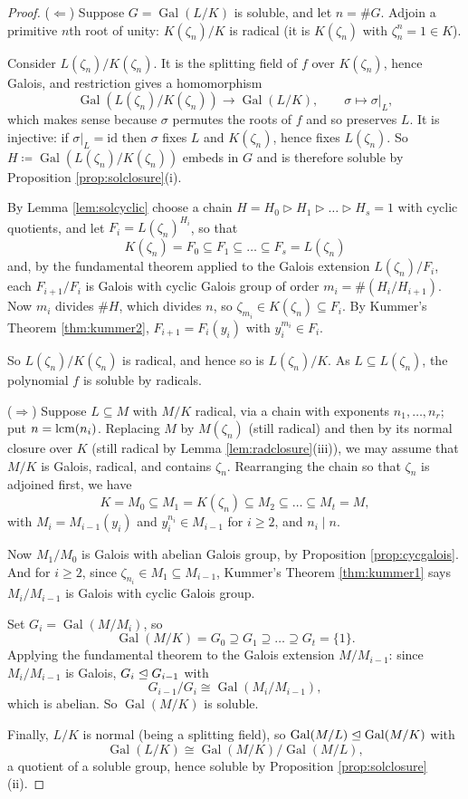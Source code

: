 \documentclass[a4paper]{scrartcl}
\newcommand{\Gal}{\operatorname{Gal}}
\begin{document}
\begin{proof}
	($\Leftarrow$) Suppose $G = \Gal(L/K)$ is soluble, and let $n = \#G$. Adjoin a primitive $n$th root of unity: $K(\zeta_n)/K$ is radical (it is $K(\zeta_n)$ with $\zeta_n^n = 1 \in K$).

	Consider $L(\zeta_n)/K(\zeta_n)$. It is the splitting field of $f$ over $K(\zeta_n)$, hence Galois, and restriction gives a homomorphism
	$$\Gal(L(\zeta_n)/K(\zeta_n)) \to \Gal(L/K), \qquad \sigma \mapsto \sigma|_L,$$
	which makes sense because $\sigma$ permutes the roots of $f$ and so preserves $L$. It is injective: if $\sigma|_L = \mathrm{id}$ then $\sigma$ fixes $L$ and $K(\zeta_n)$, hence fixes $L(\zeta_n)$. So $H \coloneqq \Gal(L(\zeta_n)/K(\zeta_n))$ embeds in $G$ and is therefore soluble by Proposition \ref{prop:solclosure}(i).

	By Lemma \ref{lem:solcyclic} choose a chain $H = H_0 \rhd H_1 \rhd\dots\rhd H_s = 1$ with cyclic quotients, and let $F_i = L(\zeta_n)^{H_i}$, so that
	$$K(\zeta_n) = F_0 \subseteq F_1 \subseteq \dots \subseteq F_s = L(\zeta_n)$$
	and, by the fundamental theorem applied to the Galois extension $L(\zeta_n)/F_i$, each $F_{i+1}/F_i$ is Galois with cyclic Galois group of order $m_i = \#(H_i/H_{i+1})$. Now $m_i$ divides $\#H$, which divides $n$, so $\zeta_{m_i} \in K(\zeta_n)\subseteq F_i$. By Kummer's Theorem \ref{thm:kummer2}, $F_{i+1} = F_i(y_i)$ with $y_i^{m_i}\in F_i$.

	So $L(\zeta_n)/K(\zeta_n)$ is radical, and hence so is $L(\zeta_n)/K$. As $L \subseteq L(\zeta_n)$, the polynomial $f$ is soluble by radicals.

	($\Rightarrow$) Suppose $L \subseteq M$ with $M/K$ radical, via a chain with exponents $n_1, \dots, n_r$; put $n = \operatorname{lcm}(n_i)$. Replacing $M$ by $M(\zeta_n)$ (still radical) and then by its normal closure over $K$ (still radical by Lemma \ref{lem:radclosure}(iii)), we may assume that $M/K$ is Galois, radical, and contains $\zeta_n$. Rearranging the chain so that $\zeta_n$ is adjoined first, we have
	$$K = M_0 \subseteq M_1 = K(\zeta_n)\subseteq M_2 \subseteq\dots\subseteq M_t = M,$$
	with $M_{i} = M_{i-1}(y_i)$ and $y_i^{n_i}\in M_{i-1}$ for $i \geq 2$, and $n_i \mid n$.

	Now $M_1/M_0$ is Galois with abelian Galois group, by Proposition \ref{prop:cycgalois}. And for $i \geq 2$, since $\zeta_{n_i}\in M_1 \subseteq M_{i-1}$, Kummer's Theorem \ref{thm:kummer1} says $M_i/M_{i-1}$ is Galois with cyclic Galois group.

	Set $G_i = \Gal(M/M_i)$, so
	$$\Gal(M/K) = G_0 \supseteq G_1 \supseteq \dots\supseteq G_t = \{1\}.$$
	Applying the fundamental theorem to the Galois extension $M/M_{i-1}$: since $M_i/M_{i-1}$ is Galois, $G_i \trianglelefteq G_{i-1}$ with
	$$G_{i-1}/G_i \cong \Gal(M_i/M_{i-1}),$$
	which is abelian. So $\Gal(M/K)$ is soluble.

	Finally, $L/K$ is normal (being a splitting field), so $\Gal(M/L)\normal \Gal(M/K)$ with
	$$\Gal(L/K)\cong \Gal(M/K)/\Gal(M/L),$$
	a quotient of a soluble group, hence soluble by Proposition \ref{prop:solclosure}(ii).
\end{proof}
\end{document}
